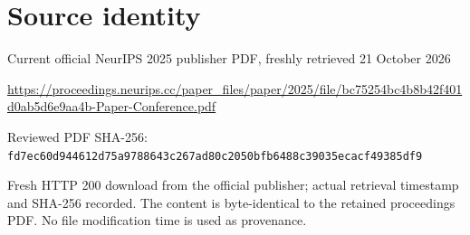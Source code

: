 \documentclass[11pt]{article}
\begin{document}
\section*{Source identity}

Current official NeurIPS 2025 publisher PDF, freshly retrieved 21 October 2026

\url{https://proceedings.neurips.cc/paper_files/paper/2025/file/bc75254bc4b8b42f401d0ab5d6e9aa4b-Paper-Conference.pdf}

Reviewed PDF SHA-256: \nolinkurl{fd7ec60d944612d75a9788643c267ad80c2050bfb6488c39035ecacf49385df9}

Fresh HTTP 200 download from the official publisher; actual retrieval timestamp and SHA-256 recorded. The content is byte-identical to the retained proceedings PDF. No file modification time is used as provenance.
\end{document}
